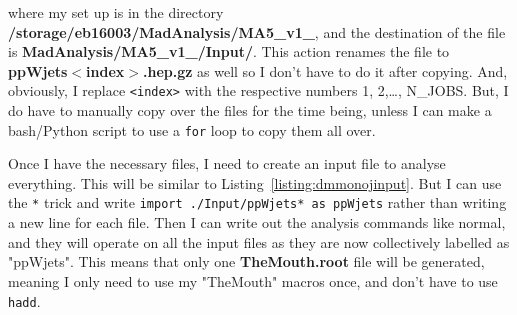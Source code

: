 where my \madanalysis set up is in the directory \textbf{/storage/eb16003/MadAnalysis/MA5\_\-v1\_}, and the destination of the file is \textbf{MadAnalysis/MA5\_\-v1\_/Input/}. This action renames the file to \textbf{ppWjets$<$index$>$.hep.gz} as well so I don't have to do it after copying. And, obviously, I replace \texttt{<index>} with the respective numbers 1, 2,\ldots, N\_JOBS. But, I do have to manually copy over the files for the time being, unless I can make a bash/Python script to use a \texttt{for} loop to copy them all over.


Once I have the necessary files, I need to create an input file to analyse everything. This will be similar to Listing~\ref{listing:dmmonojinput}. But I can use the \texttt{*} trick and write \texttt{import ./Input/ppWjets* as ppWjets} rather than writing a new line for each file. Then I can write out the analysis commands like normal, and they will operate on all the input files as they are now collectively labelled as "ppWjets". This means that only one \textbf{TheMouth.root} file will be generated, meaning I only need to use my "TheMouth" macros once, and don't have to use \texttt{hadd}.

